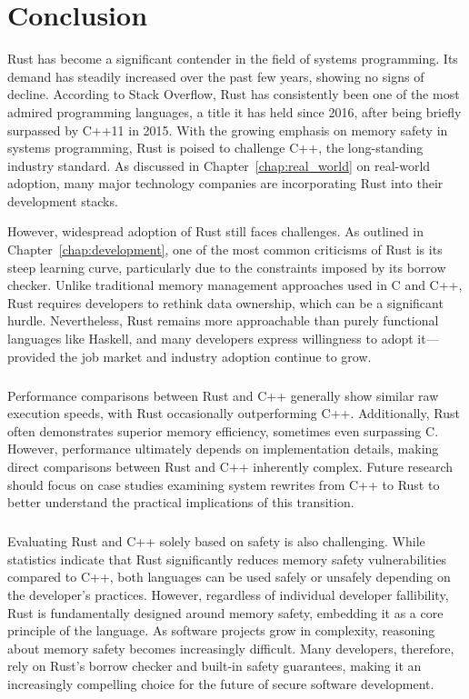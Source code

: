 \chapter{Conclusion}
\label{chap:conclusion}

Rust has become a significant contender in the field of systems programming. Its demand has steadily increased over the past few years, showing no signs of decline. According to Stack Overflow, Rust has consistently been one of the most admired programming languages\cite[]{Technology2024Stack}, a title it has held since 2016, after being briefly surpassed by C++11 in 2015. With the growing emphasis on memory safety in systems programming, Rust is poised to challenge C++, the long-standing industry standard. As discussed in Chapter~\ref{chap:real_world} on real-world adoption, many major technology companies are incorporating Rust into their development stacks.

However, widespread adoption of Rust still faces challenges. As outlined in Chapter~\ref{chap:development}, one of the most common criticisms of Rust is its steep learning curve, particularly due to the constraints imposed by its borrow checker. Unlike traditional memory management approaches used in C and C++, Rust requires developers to rethink data ownership, which can be a significant hurdle. Nevertheless, Rust remains more approachable than purely functional languages like Haskell, and many developers express willingness to adopt it—provided the job market and industry adoption continue to grow.

\paragraph{}

Performance comparisons between Rust and C++ generally show similar raw execution speeds, with Rust occasionally outperforming C++. Additionally, Rust often demonstrates superior memory efficiency, sometimes even surpassing C. However, performance ultimately depends on implementation details, making direct comparisons between Rust and C++ inherently complex. Future research should focus on case studies examining system rewrites from C++ to Rust to better understand the practical implications of this transition.

\paragraph{}

Evaluating Rust and C++ solely based on safety is also challenging. While statistics indicate that Rust significantly reduces memory safety vulnerabilities compared to C++, both languages can be used safely or unsafely depending on the developer’s practices. However, regardless of individual developer fallibility, Rust is fundamentally designed around memory safety, embedding it as a core principle of the language. As software projects grow in complexity, reasoning about memory safety becomes increasingly difficult. Many developers, therefore, rely on Rust’s borrow checker and built-in safety guarantees, making it an increasingly compelling choice for the future of secure software development.